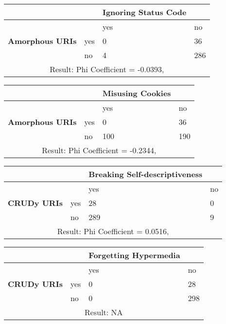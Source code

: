 \documentclass[a4paper,12pt]{article}
\begin{document}
\begin{center}
  \begin{tabular}{| p{60mm} | p{10mm} | p{35mm} | p{35mm} |}
  \hline
   & & \textbf{Ignoring Status Code} &
  \\
  \hline
  & & yes & no
  \\
  \hline
  \textbf{Amorphous URIs} & yes & 0 & 36
  \\
  \hline
   & no & 4 & 286
  \\
  \hline
  \multicolumn{4}{|c|}{Result: Phi Coefficient = -0.0393, }
  \\ \hline
  \end{tabular}
  \end{center}

\begin{center}
  \begin{tabular}{| p{60mm} | p{10mm} | p{35mm} | p{35mm} |}
  \hline
   & & \textbf{Misusing Cookies} &
  \\
  \hline
  & & yes & no
  \\
  \hline
  \textbf{Amorphous URIs} & yes & 0 & 36
  \\
  \hline
   & no & 100 & 190
  \\
  \hline
  \multicolumn{4}{|c|}{Result: Phi Coefficient = -0.2344, }
  \\ \hline
  \end{tabular}
  \end{center}

\begin{center}
  \begin{tabular}{| p{60mm} | p{10mm} | p{35mm} | p{35mm} |}
  \hline
   & & \textbf{Breaking Self-descriptiveness} &
  \\
  \hline
  & & yes & no
  \\
  \hline
  \textbf{CRUDy URIs} & yes & 28 & 0
  \\
  \hline
   & no & 289 & 9
  \\
  \hline
  \multicolumn{4}{|c|}{Result: Phi Coefficient = 0.0516, }
  \\ \hline
  \end{tabular}
  \end{center}

\begin{center}
  \begin{tabular}{| p{60mm} | p{10mm} | p{35mm} | p{35mm} |}
  \hline
   & & \textbf{Forgetting Hypermedia} &
  \\
  \hline
  & & yes & no
  \\
  \hline
  \textbf{CRUDy URIs} & yes & 0 & 28
  \\
  \hline
   & no & 0 & 298
  \\
  \hline
  \multicolumn{4}{|c|}{Result: NA}
  \\ \hline
  \end{tabular}
  \end{center}
\end{document}

